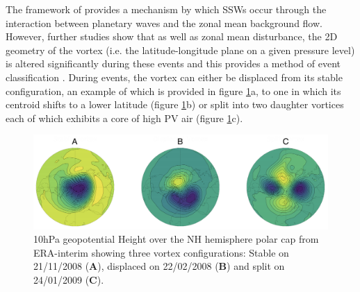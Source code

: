 The framework of \cite{matsunoDynamical1971b} provides a mechanism by which SSWs occur through the interaction between planetary waves and the zonal mean background flow. However, further studies show that as well as zonal mean disturbance, the 2D geometry of the vortex (i.e. the latitude-longitude plane on a given pressure level) is altered significantly during these events and this provides a method of event classification \citep{lehtonenObserved2016b, Mitchell2011a, Seviour2013}. During events, the vortex can either be displaced from its stable configuration, an example of which is provided in figure \ref{fig:GPH_schematic}a, to one in which its centroid shifts to a lower latitude (figure \ref{fig:GPH_schematic}b) or split into two daughter vortices each of which exhibits a core of high PV air (figure \ref{fig:GPH_schematic}c). 
\begin{figure}[h!]
\centering
\includegraphics[width= \linewidth]{Figures/Figures-background/GPH_schematic.png}
\caption[10hPa NH polar cap geopotential height for stable, split and displaced vortex configurations from ERA-Interim]{10hPa geopotential Height over the NH hemisphere polar cap from ERA-interim showing three vortex configurations: Stable on 21/11/2008 (\textbf{A}), displaced on 22/02/2008 (\textbf{B}) and split on 24/01/2009 (\textbf{C}).}
\centering
\label{fig:GPH_schematic}
\end{figure}

